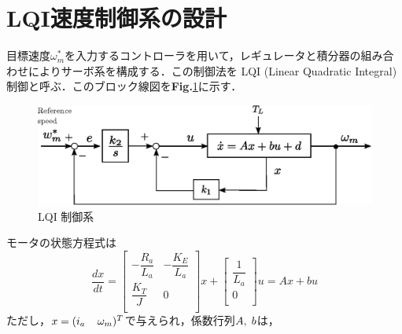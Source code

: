 \documentclass[a4paper,12pt]{jarticle}
\begin{document}
\section{LQI速度制御系の設計}
%
目標速度$ \omega _m ^* $を入力するコントローラを用いて，レギュレータと積分器の組み合わせによりサーボ系を構成する．この制御法を LQI (Linear Quadratic Integral)制御と呼ぶ．このブロック線図を{\bf Fig.}\ref{LQI}に示す．
%
\begin{figure}[tb]
 \begin{center}
  \includegraphics[scale=0.8]{../figure/eps/LQI.eps}
  \caption{LQI 制御系}
  \label{LQI}
 \end{center}
\end{figure}
%
モータの状態方程式は
%
\begin{equation}
 \dfrac{dx}{dt} =
  \left[
   \begin{array}{cc}
    - \dfrac{R_a}{L_a} & - \dfrac{K_E}{L_a} \\
    \dfrac{K_T}{J } & 0 \\
   \end{array}
  \right]
 x +
 \left[
  \begin{array}{c}
   \dfrac{1}{L_a} \\
   0 \\
  \end{array}
 \right]
 u = Ax + bu
\end{equation}
%
ただし，$ x = (i_a \hspace{4mm} \omega_m)^T $で与えられ，係数行列$ A, \hspace{1mm} b $は，
%
\end{document}
